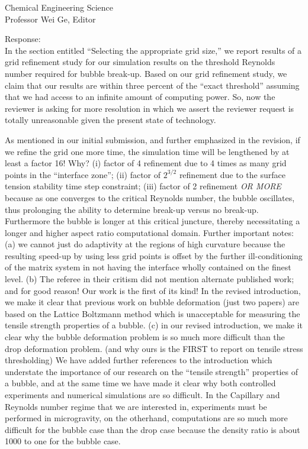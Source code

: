 \documentclass{letter}
\begin{document}
\begin{letter}{
Chemical Engineering Science\\
Professor Wei Ge, Editor\\}
\begin{enumerate}
Response: \\
In the section entitled ``Selecting the appropriate grid size,'' we 
report results of a grid refinement study for our simulation results on
the threshold Reynolds number required for bubble break-up.  Based on
our grid refinement study, we claim that our results are within three
percent of the ``exact threshold'' assuming that we had access to an
infinite amount of computing power.  So, now the reviewer is asking for
more resolution in which we assert the reviewer request is totally 
unreasonable given the present state of technology.

As mentioned in our initial submission, and further emphasized in the revision,
if we refine the grid one more time, the simulation time will be 
lengthened by at least a factor 16! Why? (i) factor of 4 refinement 
due to 4 times as many grid points in the ``interface zone''; (ii) factor of $2^{3/2}$
refinement due to the surface tension stability time step constraint; (iii) factor of 2 refinement {\em OR MORE} because as one converges to the critical Reynolds number, the bubble oscillates, thus prolonging the ability to determine break-up versus no break-up.  Furthermore the bubble is longer at this critical juncture, thereby necessitating a longer and higher aspect ratio computational domain.  Further important notes: (a) we cannot just do adaptivity at the regions of high curvature because the resulting speed-up by using less grid points is offset by the further ill-conditioning of the matrix system in not having the interface wholly contained on the finest level.  (b) The referee in their critism did not mention alternate published work; and for good reason! Our work is the first of its kind! In the revised introduction, we make it clear that previous work on bubble deformation (just two papers) are based on the Lattice Boltzmann method which is unacceptable for measuring the tensile strength properties of a bubble.   (c) in our revised introduction, we make it clear why the bubble deformation problem is so much more difficult than the drop deformation problem.  (and why ours is the FIRST to report on
tensile stress thresholding)  We have added further references to the introduction which understate the importance of our research on the ``tensile strength'' properties of a bubble, and at the same time we have made it clear why both controlled experiments and numerical simulations are so difficult.  In the Capillary and Reynolds number regime that we are interested in, experiments must be performed in microgravity, on the otherhand, computations are so much more difficult for the bubble case than the drop case because the density ratio is about 
1000 to one for the bubble case.


\end{enumerate}
\end{letter}
\end{document}
